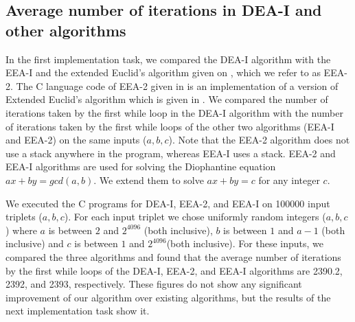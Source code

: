 \documentclass[pdflatex,sn-mathphys-num]{sn-jnl}%
\theoremstyle{thmstyleone}%
\theoremstyle{thmstyletwo}%
\theoremstyle{thmstylethree}%
\begin{document}
  \subsection{Average number of iterations in DEA-I and other algorithms}
    In the first implementation task, we compared the DEA-I algorithm with the EEA-I and the extended Euclid's algorithm given on \cite{EEAGit1}, which we refer to as EEA-2. The C language code of EEA-2 given in \cite{EEAGit1} is an implementation of a version of Extended Euclid's algorithm which is given in \cite{knuth2014art}. We compared the number of iterations taken by the first while loop in the DEA-I algorithm with the number of iterations taken by the first while loops of the other two algorithms (EEA-I and EEA-2) on the same inputs ($a,b,c$). Note that the EEA-2 algorithm does not use a stack anywhere in the program, whereas EEA-I uses a stack.  EEA-2 and EEA-I algorithms are used for solving  the Diophantine equation $ax+by=gcd(a,b)$. We extend them to solve $ax+by=c$ for any integer $c$.
 

We executed the C programs for DEA-I, EEA-2, and EEA-I on 100000 input triplets ($a,b,c$). For each input triplet we chose uniformly random integers ($a,b,c$) where $a$ is between $2$ and $2^{4096}$ (both inclusive), $b$ is between $1$ and $a-1$ (both inclusive) and $c$  is between $1$ and $2^{4096}$(both inclusive). For these inputs, we compared the three algorithms and found that the average number of iterations by the first while loops of the DEA-I, EEA-2, and EEA-I algorithms are 2390.2, 2392, and 2393, respectively. These figures do not show any significant improvement of our algorithm over existing algorithms, but the results of the next implementation task show it. 
\end{document}
